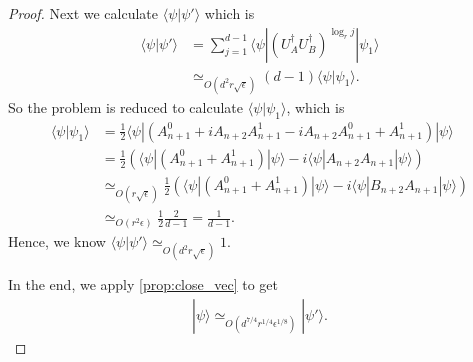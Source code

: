 \documentclass[11pt,letterpaper]{article}
\newcommand{\ket}[1]{|#1\rangle}
\newcommand{\bra}[1]{\langle#1|}
\newcommand{\braket}[2]{\langle#1|#2\rangle}
\newcommand{\ct}{^{\dagger}}
\DeclarePairedDelimiter{\norm}{\lVert}{\rVert}
\newcommand{\1}{\mathbb{1}}
\newcommand{\ep}{\epsilon}
\newcommand{\se}{\sqrt{\epsilon}}
\newcommand{\qe}{\epsilon^{1/4}}
\newcommand{\appd}[1]{\simeq_{#1}}
\newtheorem{proposition}[theorem]{Proposition}
\theoremstyle{definition}
\begin{document}
\begin{proof}
	Next we calculate $\braket{\psi}{\psi'}$ which is
	\begin{align}
		\braket{\psi}{\psi'} &= \sum_{j=1}^{d-1} \bra{\psi} (U_A\ct U_B\ct)^{\log_r j} \ket{\psi_1}\\
			& \appd{O(d^2r\se)} (d-1) \braket{\psi}{\psi_1}.
	\end{align}
	So the problem is reduced to calculate $\braket{\psi}{\psi_1}$, which is
	\begin{align}
		\braket{\psi}{\psi_1} &= \frac{1}{2} \bra{\psi} (A_{n+1}^0 + iA_{n+2}A_{n+1}^1 - iA_{n+2}A_{n+1}^0 +A_{n+1}^1) \ket{\psi}\\
		& = \frac{1}{2} \left(\bra{\psi}(A_{n+1}^0 + A_{n+1}^1) \ket{\psi} - i \bra{\psi}A_{n+2}A_{n+1} \ket{\psi} \right)\\
		& \appd{O(r\se)} \frac{1}{2} \left(\bra{\psi}(A_{n+1}^0 + A_{n+1}^1) \ket{\psi}  - i \bra{\psi}B_{n+2}A_{n+1} \ket{\psi} \right)\\
		& \appd{O(r^2 \ep)} \frac{1}{2} \frac{2}{d-1} = \frac{1}{d-1}.
	\end{align}
	Hence, we know $\braket{\psi}{\psi'} \appd{O(d^2 r \se)} 1$.
	
	In the end, we apply \cref{prop:close_vec} to get
	\begin{align}
		\ket{\psi} \appd{O(d^{7/4} r^{1/4} \ep^{1/8})} \ket{\psi'}.
	\end{align}
\end{proof}
\end{document}
